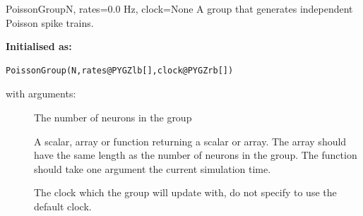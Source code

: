 \documentclass[letterpaper,10pt,english]{manual}
\begin{document}
\hypertarget{brian.PoissonGroup}{}\begin{classdesc}{PoissonGroup}{N, rates=0.0 Hz, clock=None}
A group that generates independent Poisson spike trains.

\textbf{Initialised as:}

\begin{Verbatim}[commandchars=@\[\]]
PoissonGroup(N,rates@PYGZlb[],clock@PYGZrb[])
\end{Verbatim}

with arguments:
\begin{description}
\item[]
The number of neurons in the group

\item[]
A scalar, array or function returning a scalar or array.
The array should have the same length as the number of
neurons in the group. The function should take one
argument  the current simulation time.

\item[]
The clock which the group will update with, do not
specify to use the default clock.

\end{description}
\end{classdesc}
\end{document}
